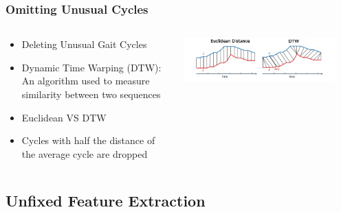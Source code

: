 \documentclass{beamer}
\begin{document}
\begin{frame}
  \frametitle{Omitting Unusual Cycles}
  \begin{columns}
  \begin{column}{.5\textwidth}
  \begin{itemize}
  	\item Deleting Unusual Gait Cycles
  	\linebreak
  	\item Dynamic Time Warping (DTW): An algorithm used to measure similarity between two sequences
  	\linebreak
  	\item Euclidean VS DTW
  	\linebreak
  	\item Cycles with half the distance of the average cycle are dropped
  \end{itemize}
  \end{column}
    \begin{column}{0.6\textwidth}
   \includegraphics[width=0.9\textwidth]{Illustrations/DTW.jpg}
       
  \end{column}
  \end{columns}
\end{frame}

\subsection{Unfixed Feature Extraction}
\end{document}
